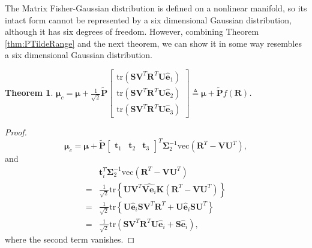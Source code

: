 \documentclass[12pt]{article}
\newtheorem{theorem}{Theorem}
\begin{document}
The Matrix Fisher-Gaussian distribution is defined on a nonlinear manifold, so its intact form cannot be represented by a six dimensional Gaussian distribution, although it has six degrees of freedom.
However, combining Theorem \ref{thm:PTildeRange} and the next theorem, we can show it in some way resembles a six dimensional Gaussian distribution.
\begin{theorem} \label{thm:Miuc}
	$\bm{\mu}_c = \bm{\mu} + \frac{1}{\sqrt{2}}\tilde{\mathbf{P}}\begin{bmatrix}
		\mathrm{tr}\left(\mathbf{S}\mathbf{V}^T\mathbf{R}^T\mathbf{U}\hat{\bm{e}}_1\right) \\
		\mathrm{tr}\left(\mathbf{S}\mathbf{V}^T\mathbf{R}^T\mathbf{U}\hat{\bm{e}}_2\right) \\
		\mathrm{tr}\left(\mathbf{S}\mathbf{V}^T\mathbf{R}^T\mathbf{U}\hat{\bm{e}}_3\right)
	\end{bmatrix} \triangleq \bm{\mu}+\tilde{\mathbf{P}}f(\mathbf{R})$.
\end{theorem}
\begin{proof}
	\begin{equation}
		\bm{\mu}_c = \bm{\mu} + \tilde{\mathbf{P}}\begin{bmatrix}
		\bm{t}_1 & \bm{t}_2 & \bm{t}_3
		\end{bmatrix}^T\mathbf{\Sigma}_2^{-1} \mathrm{vec}\left(\mathbf{R}^T-\mathbf{V}\mathbf{U}^T\right),
	\end{equation}
	and 
	\begin{equation}
		\begin{split}
			&\bm{t}_i^T\mathbf{\Sigma}_2^{-1}\mathrm{vec}\left(\mathbf{R}^T-\mathbf{V}\mathbf{U}^T\right) \\
			= &\frac{1}{\sqrt{2}}\mathrm{tr}\left\{\mathbf{U}\mathbf{V}^T\widehat{\mathbf{V}\bm{e}_i}\mathbf{K}\left(\mathbf{R}^T-\mathbf{V}\mathbf{U}^T\right)\right\} \\
			= &\frac{1}{\sqrt{2}}\mathrm{tr}\left\{\mathbf{U}\hat{\bm{e}}_i\mathbf{S}\mathbf{V}^T\mathbf{R}^T+\mathbf{U}\hat{\bm{e}}_i\mathbf{S}\mathbf{U}^T\right\} \\
			= &\frac{1}{\sqrt{2}}\mathrm{tr}\left(\mathbf{S}\mathbf{V}^T\mathbf{R}^T\mathbf{U}\hat{\bm{e}}_i + \mathbf{S}\hat{\bm{e}}_i\right),
		\end{split}
	\end{equation}
	where the second term vanishes.
\end{proof}
\end{document}

